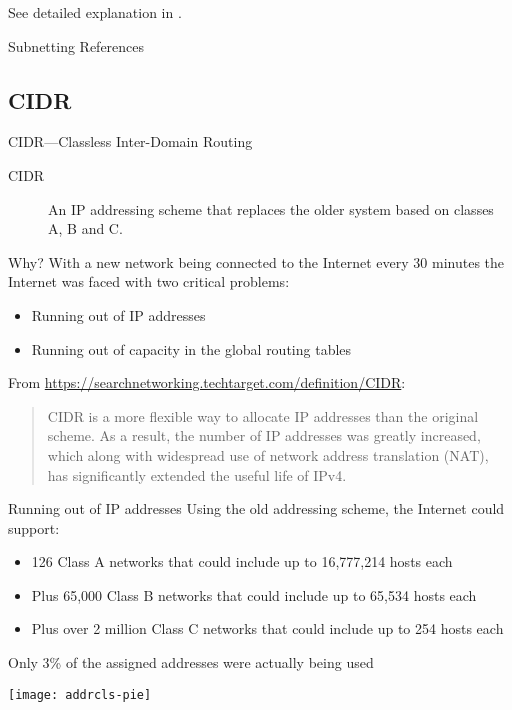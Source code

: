 See detailed explanation in .

\begin{frame}{Subnetting References}
  \begin{refsection}
    \nocite{wiki:subnet, wiki:ipv4subnetref,wiki:privatenet,rfc917,rfc950}
    \printbibliography[heading=none]
  \end{refsection}
\end{frame}

\subsection{CIDR}

\begin{frame}{CIDR---Classless Inter-Domain Routing}
  \begin{description}
  \item[CIDR] An IP addressing scheme that replaces the older system
    based on classes A, B and C.
  \end{description}
  \begin{iblock}{Why?}
    With a new network being connected to the Internet every 30 minutes the Internet was
    faced with two critical problems:
    \begin{itemize}
    \item Running out of IP addresses
    \item Running out of capacity in the global routing tables
    \end{itemize}
  \end{iblock}
\end{frame}

From \url{https://searchnetworking.techtarget.com/definition/CIDR}:
\begin{quote}
  CIDR is a more flexible way to allocate IP addresses than the original scheme. As a
  result, the number of IP addresses was greatly increased, which along with widespread
  use of network address translation (NAT), has significantly extended the useful life of
  IPv4.
\end{quote}

\begin{frame}{Running out of IP addresses}
  Using the old addressing scheme, the Internet could support:
  \begin{itemize}
  \item 126 Class A networks that could include up to 16,777,214 hosts each
  \item Plus 65,000 Class B networks that could include up to 65,534 hosts each
  \item Plus over 2 million Class C networks that could include up to 254 hosts each
  \end{itemize}
  \begin{minipage}{.79\linewidth}
    Only 3\% of the assigned addresses were actually being used
  \end{minipage}
  \begin{minipage}{.2\linewidth}
    \texttt{[image: addrcls-pie]}
  \end{minipage}  
\end{frame}

